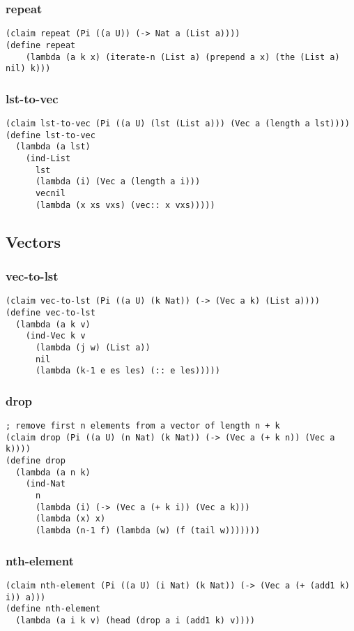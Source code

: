 \subsubsection{repeat} \label{code:repeat}
\begin{verbatim}
(claim repeat (Pi ((a U)) (-> Nat a (List a))))
(define repeat
    (lambda (a k x) (iterate-n (List a) (prepend a x) (the (List a) nil) k)))
\end{verbatim}


\subsubsection{lst-to-vec} \label{code:lst-to-vec}
\begin{verbatim}
(claim lst-to-vec (Pi ((a U) (lst (List a))) (Vec a (length a lst))))
(define lst-to-vec
  (lambda (a lst)
    (ind-List
      lst
      (lambda (i) (Vec a (length a i)))
      vecnil
      (lambda (x xs vxs) (vec:: x vxs)))))
\end{verbatim}

\subsection{Vectors}

\subsubsection{vec-to-lst} \label{code:vec-to-lst}
\begin{verbatim}
(claim vec-to-lst (Pi ((a U) (k Nat)) (-> (Vec a k) (List a))))
(define vec-to-lst
  (lambda (a k v)
    (ind-Vec k v
      (lambda (j w) (List a))
      nil
      (lambda (k-1 e es les) (:: e les)))))
\end{verbatim}

\subsubsection{drop} \label{code:drop}
\begin{verbatim}
; remove first n elements from a vector of length n + k
(claim drop (Pi ((a U) (n Nat) (k Nat)) (-> (Vec a (+ k n)) (Vec a k))))
(define drop
  (lambda (a n k)
    (ind-Nat
      n
      (lambda (i) (-> (Vec a (+ k i)) (Vec a k)))
      (lambda (x) x)
      (lambda (n-1 f) (lambda (w) (f (tail w)))))))
\end{verbatim}

\subsubsection{nth-element} \label{code:nth-element}
\begin{verbatim}
(claim nth-element (Pi ((a U) (i Nat) (k Nat)) (-> (Vec a (+ (add1 k) i)) a)))
(define nth-element
  (lambda (a i k v) (head (drop a i (add1 k) v))))
\end{verbatim}

